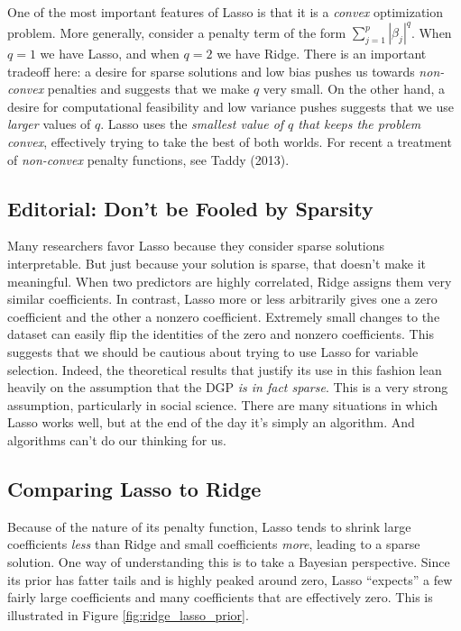 One of the most important features of Lasso is that it is a \emph{convex} optimization problem.
More generally, consider a penalty term of the form $\sum_{j=1}^p |\beta_j|^q$.
When $q=1$ we have Lasso, and when $q = 2$ we have Ridge.
There is an important tradeoff here: a desire for sparse solutions and low bias pushes us towards \emph{non-convex} penalties and suggests that we make $q$ very small.
On the other hand, a desire for computational feasibility and low variance pushes suggests that we use \emph{larger} values of $q$.
Lasso uses the \emph{smallest value of $q$ that keeps the problem convex}, effectively trying to take the best of both worlds.
For recent a treatment of \emph{non-convex} penalty functions, see Taddy (2013).

\subsection{Editorial: Don't be Fooled by Sparsity}
Many researchers favor Lasso because they consider sparse solutions interpretable.
But just because your solution is sparse, that doesn't make it meaningful.
When two predictors are highly correlated, Ridge assigns them very similar coefficients.
In contrast, Lasso more or less arbitrarily gives one a zero coefficient and the other a nonzero coefficient.
Extremely small changes to the dataset can easily flip the identities of the zero and nonzero coefficients.
This suggests that we should be cautious about trying to use Lasso for variable selection.
Indeed, the theoretical results that justify its use in this fashion lean heavily on the assumption that the DGP \emph{is in fact sparse}.
This is a very strong assumption, particularly in social science.
There are many situations in which Lasso works well, but at the end of the day it's simply an algorithm.
And algorithms can't do our thinking for us.


\subsection{Comparing Lasso to Ridge}
Because of the nature of its penalty function, Lasso tends to shrink large coefficients \emph{less} than Ridge and small coefficients \emph{more}, leading to a sparse solution. One way of understanding this is to take a Bayesian perspective. Since its prior has fatter tails and is highly peaked around zero, Lasso ``expects'' a few fairly large coefficients and many coefficients that are effectively zero. This is illustrated in Figure \ref{fig:ridge_lasso_prior}.

